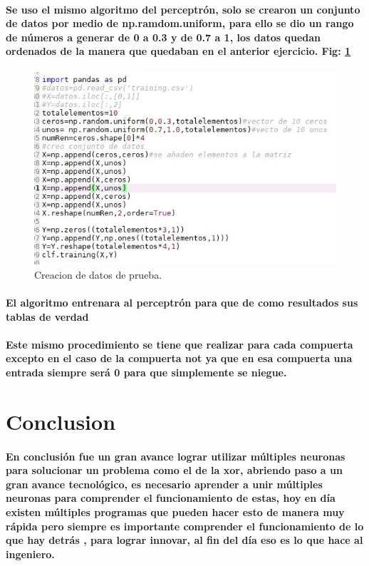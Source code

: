 \documentclass[10pt,a4paper]{article}
\begin{document}
\paragraph{Se uso el mismo algoritmo del perceptr\'on, solo se crearon un conjunto de datos por medio de np.ramdom.uniform, para ello se dio un rango de n\'umeros a generar  de 0 a 0.3 y de 0.7 a 1,
los datos quedan ordenados de la manera que quedaban en el anterior ejercicio. Fig: \ref{fig:and}}

\begin{figure}[h]
\includegraphics[scale=0.7] {and.jpg}
\caption{Creacion de datos de prueba.}
\label{fig:and}
\end{figure}

\paragraph{El algoritmo entrenara al perceptr\'on para que de como resultados sus tablas de verdad}

\paragraph{Este mismo procedimiento se tiene que realizar para cada compuerta excepto en el caso de la compuerta not ya que en esa compuerta una entrada siempre ser\'a 0 para que simplemente se niegue.}

\section{Conclusion}
\paragraph{En conclusi\'on fue un gran avance lograr utilizar múltiples neuronas para solucionar un problema como el de la xor, abriendo paso a un gran avance tecnol\'ogico, es necesario aprender a unir m\'ultiples neuronas para comprender el funcionamiento de estas, hoy en d\'ia existen m\'ultiples programas que pueden hacer esto de manera muy r\'apida pero siempre es importante comprender el funcionamiento de lo que hay detr\'as , para lograr innovar, al fin del d\'ia eso es lo que hace al ingeniero.}
\end{document}

